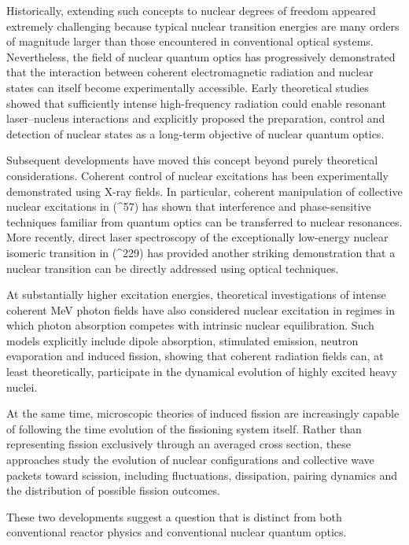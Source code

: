 Historically, extending such concepts to nuclear degrees of freedom appeared extremely challenging because typical nuclear transition energies are many orders of magnitude larger than those encountered in conventional optical systems. Nevertheless, the field of nuclear quantum optics has progressively demonstrated that the interaction between coherent electromagnetic radiation and nuclear states can itself become experimentally accessible. Early theoretical studies showed that sufficiently intense high-frequency radiation could enable resonant laser–nucleus interactions and explicitly proposed the preparation, control and detection of nuclear states as a long-term objective of nuclear quantum optics.

Subsequent developments have moved this concept beyond purely theoretical considerations. Coherent control of nuclear excitations has been experimentally demonstrated using X-ray fields. In particular, coherent manipulation of collective nuclear excitations in (^{57}) has shown that interference and phase-sensitive techniques familiar from quantum optics can be transferred to nuclear resonances. More recently, direct laser spectroscopy of the exceptionally low-energy nuclear isomeric transition in (^{229}) has provided another striking demonstration that a nuclear transition can be directly addressed using optical techniques.

At substantially higher excitation energies, theoretical investigations of intense coherent MeV photon fields have also considered nuclear excitation in regimes in which photon absorption competes with intrinsic nuclear equilibration. Such models explicitly include dipole absorption, stimulated emission, neutron evaporation and induced fission, showing that coherent radiation fields can, at least theoretically, participate in the dynamical evolution of highly excited heavy nuclei.

At the same time, microscopic theories of induced fission are increasingly capable of following the time evolution of the fissioning system itself. Rather than representing fission exclusively through an averaged cross section, these approaches study the evolution of nuclear configurations and collective wave packets toward scission, including fluctuations, dissipation, pairing dynamics and the distribution of possible fission outcomes.

These two developments suggest a question that is distinct from both conventional reactor physics and conventional nuclear quantum optics.

